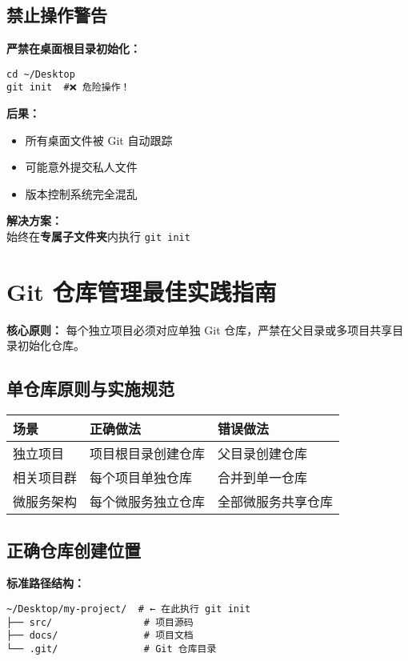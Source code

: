 \subsection{禁止操作警告}
\textbf{严禁在桌面根目录初始化：}
\begin{verbatim}
cd ~/Desktop
git init  #❌ 危险操作！
\end{verbatim}
\textbf{后果：}
\begin{itemize}[leftmargin=*, nosep]
    \item 所有桌面文件被 Git 自动跟踪
    \item 可能意外提交私人文件
    \item 版本控制系统完全混乱
\end{itemize}
\textbf{解决方案：} \\
始终在\textbf{专属子文件夹}内执行 \texttt{git init}

\section{Git 仓库管理最佳实践指南}
\textbf{核心原则：}  
每个独立项目必须对应单独 Git 仓库，严禁在父目录或多项目共享目录初始化仓库。

\subsection{单仓库原则与实施规范}
\begin{center}
\begin{tabular}{lll}
    \toprule
    \textbf{场景} & \textbf{正确做法} & \textbf{错误做法} \\
    \midrule
    独立项目 & 项目根目录创建仓库 & 父目录创建仓库 \\
    相关项目群 & 每个项目单独仓库 & 合并到单一仓库 \\
    微服务架构 & 每个微服务独立仓库 & 全部微服务共享仓库 \\
    \bottomrule
\end{tabular}
\end{center}

\subsection{正确仓库创建位置}
\textbf{标准路径结构：}
\begin{verbatim}
~/Desktop/my-project/  # ← 在此执行 git init
├── src/                # 项目源码
├── docs/               # 项目文档
└── .git/               # Git 仓库目录
\end{verbatim}

